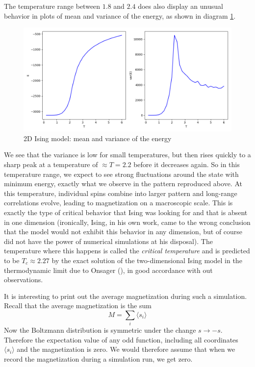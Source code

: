 \documentclass[a4paper, draft]{article}
\theoremstyle{own}
\theoremstyle{remark}
\begin{document}
The temperature range between $1.8$ and $2.4$ does also display an unusual behavior in plots of mean and variance of the energy, as shown in diagram \ref{fig:Ising2DValues}. 

\begin{figure}[ht]
\centering
\includegraphics[width=1.0\linewidth]{Ising2DValues}
\caption{2D Ising model: mean and variance of the energy}
\label{fig:Ising2DValues}
\end{figure}

We see that the variance is low for small temperatures, but then rises quickly to  a sharp peak at a temperature of $\approx T = 2.2$ before it decreases again. So in this temperature range, we expect to see strong fluctuations around the state with minimum energy, exactly what we observe in the pattern reproduced above. At this temperature, individual spins combine into larger pattern and long-range correlations evolve, leading to magnetization on a macroscopic scale. This is exactly the type of critical behavior that Ising was looking for and that is absent in one dimension (ironically, Ising, in his own work, came to the wrong conclusion that the model would not exhibit this behavior in any dimension, but of course did not have the power of numerical simulations at his disposal). The temperature where this happens is called the {\em critical temperature} and is predicted to be $T_c \approx 2.27$ by the exact solution of the two-dimensional Ising model in the thermodynamic limit due to Onsager (\cite{Schroeder}), in good accordance with out observations.

It is interesting to print out the average magnetization during such a simulation. Recall that the average magnetization is the sum
$$
M = \sum_i \langle s_i \rangle
$$
Now the Boltzmann distribution is symmetric under the change $s \rightarrow -s$. Therefore the expectation value of any odd function, including all coordinates $\langle s_i \rangle$ and the magnetization is zero. We would therefore assume that when we record the magnetization during a simulation run, we get zero.
\end{document}
